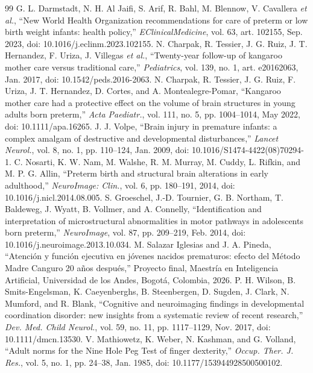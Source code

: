 \documentclass[conference,letterpaper,10pt]{IEEEtran}
\begin{document}
\newpage
\begin{thebibliography}{99}
 G. L. Darmstadt, N. H. Al Jaifi, S. Arif, R. Bahl, M. Blennow, V. Cavallera \emph{et al.}, ``New World Health Organization recommendations for care of preterm or low birth weight infants: health policy,'' \emph{EClinicalMedicine}, vol. 63, art. 102155, Sep. 2023, doi: 10.1016/j.eclinm.2023.102155.
 N. Charpak, R. Tessier, J. G. Ruiz, J. T. Hernandez, F. Uriza, J. Villegas \emph{et al.}, ``Twenty-year follow-up of kangaroo mother care versus traditional care,'' \emph{Pediatrics}, vol. 139, no. 1, art. e20162063, Jan. 2017, doi: 10.1542/peds.2016-2063.
 N. Charpak, R. Tessier, J. G. Ruiz, F. Uriza, J. T. Hernandez, D. Cortes, and A. Montealegre-Pomar, ``Kangaroo mother care had a protective effect on the volume of brain structures in young adults born preterm,'' \emph{Acta Paediatr.}, vol. 111, no. 5, pp. 1004--1014, May 2022, doi: 10.1111/apa.16265.
 J. J. Volpe, ``Brain injury in premature infants: a complex amalgam of destructive and developmental disturbances,'' \emph{Lancet Neurol.}, vol. 8, no. 1, pp. 110--124, Jan. 2009, doi: 10.1016/S1474-4422(08)70294-1.
 C. Nosarti, K. W. Nam, M. Walshe, R. M. Murray, M. Cuddy, L. Rifkin, and M. P. G. Allin, ``Preterm birth and structural brain alterations in early adulthood,'' \emph{NeuroImage: Clin.}, vol. 6, pp. 180--191, 2014, doi: 10.1016/j.nicl.2014.08.005.
 S. Groeschel, J.-D. Tournier, G. B. Northam, T. Baldeweg, J. Wyatt, B. Vollmer, and A. Connelly, ``Identification and interpretation of microstructural abnormalities in motor pathways in adolescents born preterm,'' \emph{NeuroImage}, vol. 87, pp. 209--219, Feb. 2014, doi: 10.1016/j.neuroimage.2013.10.034.
 M. Salazar Iglesias and J. A. Pineda, ``Atención y función ejecutiva en jóvenes nacidos prematuros: efecto del Método Madre Canguro 20 años después,'' Proyecto final, Maestría en Inteligencia Artificial, Universidad de los Andes, Bogotá, Colombia, 2026.
 P. H. Wilson, B. Smits-Engelsman, K. Caeyenberghs, B. Steenbergen, D. Sugden, J. Clark, N. Mumford, and R. Blank, ``Cognitive and neuroimaging findings in developmental coordination disorder: new insights from a systematic review of recent research,'' \emph{Dev. Med. Child Neurol.}, vol. 59, no. 11, pp. 1117--1129, Nov. 2017, doi: 10.1111/dmcn.13530.
 V. Mathiowetz, K. Weber, N. Kashman, and G. Volland, ``Adult norms for the Nine Hole Peg Test of finger dexterity,'' \emph{Occup. Ther. J. Res.}, vol. 5, no. 1, pp. 24--38, Jan. 1985, doi: 10.1177/153944928500500102.

\end{thebibliography}
\end{document}
